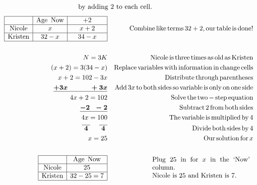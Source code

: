 \begin{example}
\begin{eqnarray*}
\begin{array}{p{0.425\textwidth}}
		\tmop{by~adding~2~to~each~cell}.%
    \end{array}%
 	\end{eqnarray*}
	\begin{eqnarray*}
			\begin{array}{|c|c|c|}
      \hline
      & \tmop{Age~} \tmop{Now} & + 2\\
      \hline
      \tmop{Nicole} & x & ~~~~x + 2~~~~\\
      \hline
      \tmop{Kristen} & 32 - x & 34 - x\\
      \hline
    \end{array} &  & \tmop{Combine} \tmop{like} \tmop{terms} 32 + 2,
    \tmop{our} \tmop{table} \tmop{is} \tmop{done}!\\
    &  & \\
   N = 3 K &  & \tmop{Nicole} \tmop{is} \tmop{three} \tmop{times} \tmop{as}
    \tmop{old} \tmop{as} \tmop{Kristen}\\
    (x + 2) = 3 (34 - x) &  & \tmop{Replace} \tmop{variables} \tmop{with}
    \tmop{information} \tmop{in} \tmop{change} \tmop{cells}\\
    x + 2 = 102 - 3 x &  & \tmop{Distribute} \tmop{through}
    \tmop{parentheses}\\
    \tmmathbf{\underline{+ 3 x ~~~~~~~~~~+ 3 x}} &  & \tmop{Add} 3 x \tmop{to}
    \tmop{both} \tmop{sides} \tmop{so} \tmop{variable} \tmop{is} \tmop{only}
    \tmop{on} \tmop{one} \tmop{side}\\
    4 x + 2 = 102 &  & \tmop{Solve} \tmop{the} \tmop{two} - \tmop{step}
    \tmop{equation}\\
    \tmmathbf{\underline{- 2 ~~ - 2}} &  & \tmop{Subtract} 2 \tmop{from}
    \tmop{both} \tmop{sides}\\
    4 x = 100 &  & \tmop{The} \tmop{variable} \tmop{is} \tmop{multiplied}
    \tmop{by} 4\\
    \tmmathbf{\overline{~4~} ~~~~ \overline{~4~}} &  & \tmop{Divide} \tmop{both}
    \tmop{sides} \tmop{by} 4\\
    x = 25 &  & \tmop{Our} \tmop{solution} \tmop{for} x\\
		& & \\
    \begin{array}{|c|c|}
      \hline
      & \tmop{Age~} \tmop{Now}\\
      \hline
      \tmop{Nicole} & 25\\
      \hline
      \tmop{Kristen} & 32 - 25 = 7\\
      \hline
    \end{array} &  & \begin{array}{p{0.425\textwidth}}
      \tmop{Plug} 25 \tmop{in} \tmop{for} $x$ \tmop{in} \tmop{the} \tmop{`Now'}
      \tmop{column}.\\
      \tmop{Nicole} \tmop{is} 25 \tmop{and} \tmop{Kristen} \tmop{is} 7.
    \end{array}
  \end{eqnarray*}
\end{example}
\pp

